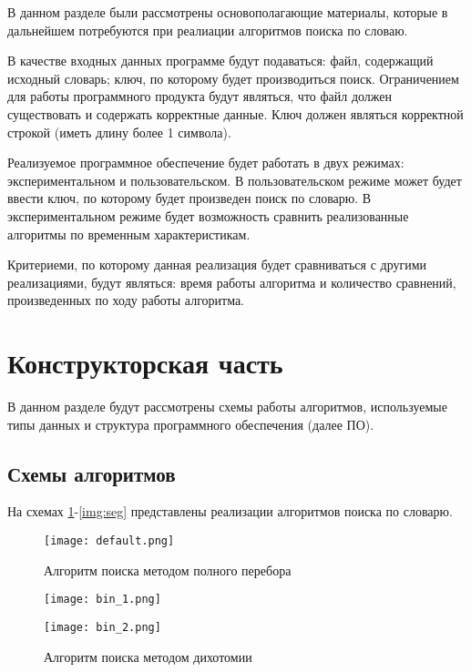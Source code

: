 В данном разделе были рассмотрены основополагающие материалы, которые в дальнейшем потребуются при реалиации алгоритмов поиска по словаю.

В качестве входных данных программе будут подаваться: файл, содержащий исходный словарь; ключ, по которому будет производиться поиск. Ограничением для работы программного продукта будут являться, что файл должен существовать и содержать корректные данные. Ключ должен являться корректной строкой (иметь длину более 1 символа).

Реализуемое программное обеспечение будет работать в двух режимах: экспериментальном и пользовательском. В пользовательском режиме может будет ввести ключ, по которому будет произведен поиск по словарю. В экспериментальном режиме будет возможность сравнить реализованные алгоритмы по временным характеристикам.

Критериеми, по которому данная реализация будет сравниваться с другими реализациями, будут являться: время работы алгоритма и количество сравнений, произведенных по ходу работы алгоритма.

\section{Конструкторская часть}

В данном разделе будут рассмотрены схемы работы алгоритмов, используемые типы данных и структура программного обеспечения (далее ПО).

\subsection{Схемы алгоритмов}

На схемах \ref{img:default}-\ref{img:seg} представлены реализации алгоритмов поиска по словарю.

\begin{figure}[H]
    \centering
    \texttt{[image: default.png]}
    \caption{Алгоритм поиска методом полного перебора}
    \label{img:default}
\end{figure}

\begin{figure}[H]
    \centering
    \texttt{[image: bin\_1.png]}
    \label{img:bin_1}
\end{figure}

\begin{figure}[H]
    \centering
    \texttt{[image: bin\_2.png]}
    \caption{Алгоритм поиска методом дихотомии}
    \label{img:bin_1}
\end{figure}

